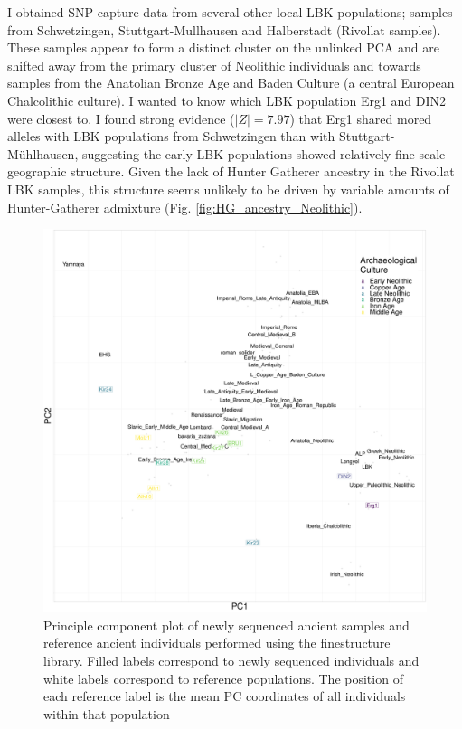I obtained SNP-capture data from several other local LBK populations; samples from Schwetzingen, Stuttgart-Mullhausen and Halberstadt (Rivollat samples). These samples appear to form a distinct cluster on the unlinked PCA and are shifted away from the primary cluster of Neolithic individuals and towards samples from the Anatolian Bronze Age and Baden Culture (a central European Chalcolithic culture). I wanted to know which LBK population Erg1 and DIN2 were closest to. I found strong evidence ($|Z| = 7.97$) that Erg1 shared mored alleles with LBK populations from Schwetzingen than with Stuttgart-Mühlhausen, suggesting the early LBK populations showed relatively fine-scale geographic structure. Given the lack of Hunter Gatherer ancestry in the Rivollat LBK samples, this structure seems unlikely to be driven by variable amounts of Hunter-Gatherer admixture (Fig. \ref{fig:HG_ancestry_Neolithic}).

\begin{figure}[htp]
    \centering
    \includegraphics[width=1.0\textwidth]{../images/chapter4/chromopainter_PCA.pdf}
    \caption{Principle component plot of newly sequenced ancient samples and reference ancient individuals performed using the finestructure library. Filled labels correspond to newly sequenced individuals and white labels correspond to reference populations. The position of each reference label is the mean PC coordinates of all individuals within that population}
    \label{fig:chapter4_results_finestructure pca}
\end{figure}

